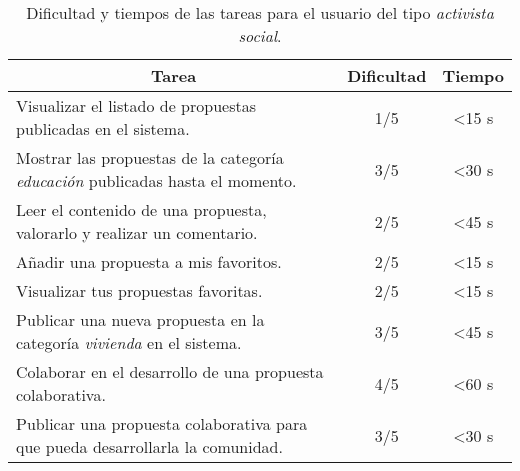 \begin{table}[!]
\centering
\caption{Dificultad y tiempos de las tareas para el usuario del tipo \textit{activista social}.}
\label{tableUserEvS}
\begin{tabular}{|m{9cm}|c|c|}
\hline
\multicolumn{1}{|c|}{{\bf Tarea}}                                                       & {\bf Dificultad} & {\bf Tiempo}   \\ \hline
Visualizar el listado de propuestas publicadas en el sistema.                           & 1/5              & \textless 15 s \\ \hline
Mostrar las propuestas de la categoría \textit{educación} publicadas hasta el momento. & 3/5              & \textless 30 s \\ \hline
Leer el contenido de una propuesta, valorarlo y realizar un comentario.                 & 2/5              & \textless 45 s \\ \hline
Añadir una propuesta a mis favoritos.                                                   & 2/5              & \textless 15 s \\ \hline
Visualizar tus propuestas favoritas.                                                    & 2/5              & \textless 15 s \\ \hline
Publicar una nueva propuesta en la categoría \textit{vivienda} en el sistema.         & 3/5              & \textless 45 s \\ \hline
Colaborar en el desarrollo de una propuesta colaborativa.                               & 4/5              & \textless 60 s \\ \hline
Publicar una propuesta colaborativa para que pueda desarrollarla la comunidad.          & 3/5              & \textless 30 s \\ \hline
\end{tabular}
\end{table}


